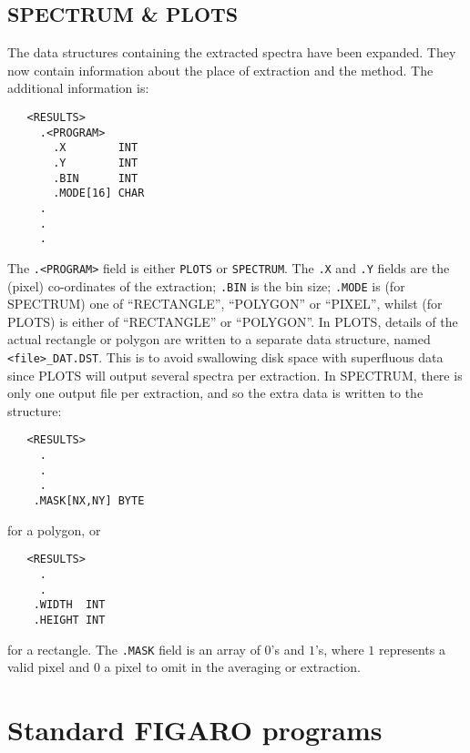 \subsection{SPECTRUM \& PLOTS}

The data structures containing the extracted spectra have been expanded.
They now contain information about the place of extraction and the method.
The additional information is:

\begin{myquote}
\begin{verbatim}
   <RESULTS> 
     .<PROGRAM>
       .X        INT
       .Y        INT
       .BIN      INT
       .MODE[16] CHAR
     .
     .
     .
\end{verbatim}
\end{myquote}

The {\tt .<PROGRAM>} field is either {\tt PLOTS} or {\tt SPECTRUM}.
The {\tt .X} and {\tt .Y} fields are the (pixel) co-ordinates of the
extraction; {\tt .BIN} is the bin size; {\tt .MODE} is (for SPECTRUM) one of
``RECTANGLE'', ``POLYGON'' or ``PIXEL'', whilst (for PLOTS) is either of
``RECTANGLE'' or ``POLYGON''. In PLOTS, details of the actual rectangle 
or polygon are written to a separate data structure, named {\tt
<file>\_DAT.DST}. This is to avoid swallowing disk space with superfluous data
since PLOTS will output several spectra per extraction.
In SPECTRUM, there is only one output file per extraction, and so the extra
data is written to the structure:

\begin{myquote}
\begin{verbatim}
   <RESULTS> 
     .
     .
     .
    .MASK[NX,NY] BYTE
\end{verbatim}
\end{myquote}

for a polygon, or

\begin{myquote}
\begin{verbatim}
   <RESULTS> 
     .
     .
    .WIDTH  INT
    .HEIGHT INT
\end{verbatim}
\end{myquote}

for a rectangle. The {\tt .MASK} field is an array of $0$'s and $1$'s, where
$1$ represents a valid pixel and $0$ a pixel to omit in the averaging or
extraction.
              
\section{Standard FIGARO programs{}}
\label{sec:figaro}

